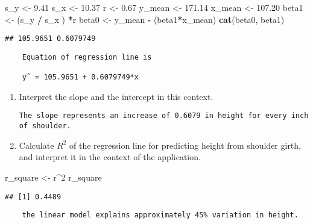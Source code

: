 \documentclass[]{article}
\newenvironment{Shaded}{\begin{snugshade}}{\end{snugshade}}
\newcommand{\KeywordTok}[1]{\textcolor[rgb]{0.13,0.29,0.53}{\textbf{#1}}}
\newcommand{\DecValTok}[1]{\textcolor[rgb]{0.00,0.00,0.81}{#1}}
\newcommand{\FloatTok}[1]{\textcolor[rgb]{0.00,0.00,0.81}{#1}}
\newcommand{\StringTok}[1]{\textcolor[rgb]{0.31,0.60,0.02}{#1}}
\newcommand{\OperatorTok}[1]{\textcolor[rgb]{0.81,0.36,0.00}{\textbf{#1}}}
\newcommand{\NormalTok}[1]{#1}
\begin{document}
\begin{Shaded}
\begin{Highlighting}[]
\NormalTok{s_y <-}\StringTok{ }\FloatTok{9.41}
\NormalTok{s_x <-}\StringTok{ }\FloatTok{10.37}
\NormalTok{r <-}\StringTok{ }\FloatTok{0.67}
\NormalTok{y_mean <-}\StringTok{ }\FloatTok{171.14}
\NormalTok{x_mean <-}\StringTok{ }\FloatTok{107.20}
\NormalTok{beta1 <-}\StringTok{ }\NormalTok{(s_y }\OperatorTok{/}\StringTok{ }\NormalTok{s_x ) }\OperatorTok{*}\NormalTok{r}
\NormalTok{beta0 <-}\StringTok{ }\NormalTok{y_mean }\OperatorTok{-}\StringTok{ }\NormalTok{(beta1}\OperatorTok{*}\NormalTok{x_mean)}
\KeywordTok{cat}\NormalTok{(beta0, beta1)}
\end{Highlighting}
\end{Shaded}

\begin{verbatim}
## 105.9651 0.6079749
\end{verbatim}

\begin{verbatim}
    Equation of regression line is

    yˆ = 105.9651 + 0.6079749*x
\end{verbatim}

\begin{enumerate}
\def\labelenumi{(\alph{enumi})}
\setcounter{enumi}{1}
\item
  Interpret the slope and the intercept in this context.

\begin{verbatim}
The slope represents an increase of 0.6079 in height for every inch of shoulder.
\end{verbatim}
\item
  Calculate \(R^2\) of the regression line for predicting height from
  shoulder girth, and interpret it in the context of the application.
\end{enumerate}

\begin{Shaded}
\begin{Highlighting}[]
\NormalTok{r_square <-}\StringTok{ }\NormalTok{r}\OperatorTok{^}\DecValTok{2}
\NormalTok{r_square}
\end{Highlighting}
\end{Shaded}

\begin{verbatim}
## [1] 0.4489
\end{verbatim}

\begin{verbatim}
    the linear model explains approximately 45% variation in height.
\end{verbatim}
\end{document}
